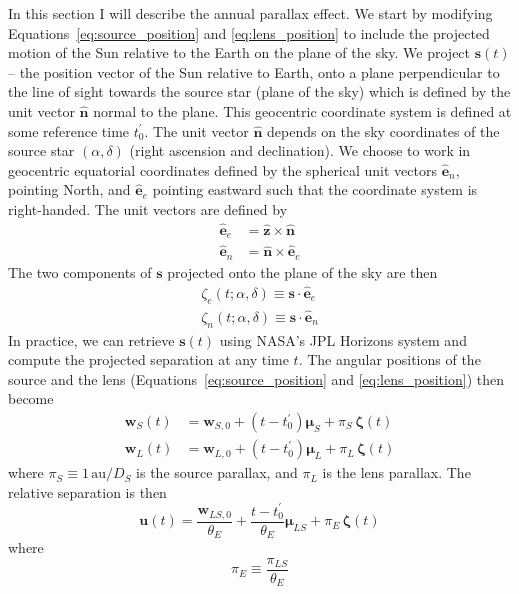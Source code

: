\documentclass[12pt,dvipsnames]{report}
\renewcommand{\vec}[1]{\boldsymbol{\mathbf{#1}}}
\begin{document}
In this section I will describe the annual parallax effect. We start by
modifying Equations~\ref{eq:source_position} and \ref{eq:lens_position} to
include the projected motion of the Sun relative to the Earth on the plane of
the sky. We project $\mathbf s(t)$ -- the position vector of the Sun relative to
Earth, onto a plane perpendicular to the line of sight towards the source star
(plane of the sky) which is defined by the unit vector $\boldsymbol{\hat n}$
normal to the plane. This geocentric coordinate system is defined at some reference time
$t_0^\prime$.  The unit vector $\boldsymbol{\hat n}$ depends on the sky
coordinates of the source star $(\alpha,\delta)$ (right ascension and
declination). We choose to work in geocentric equatorial coordinates defined by
the spherical unit vectors $\hat{\mathbf e}_n$, pointing North, and
$\hat{\mathbf e}_e$ pointing eastward such that the coordinate system is
right-handed. The unit vectors are defined by
\begin{align}
    \hat{\mathbf e}_e & = \hat{\mathbf z}\times \hat{\mathbf n}  \\
    \hat{\mathbf e}_n & = \hat{\mathbf n}\times\hat{\mathbf e}_e
\end{align}
The two components of $\mathbf s$ projected onto the plane of the sky are then
\begin{align}
    \zeta_e(t;\alpha,\delta)\equiv \mathbf s\cdot \hat{\mathbf e}_e 
    \label{eq:zeta_e_t}\\
    \zeta_n(t;\alpha,\delta)\equiv \mathbf s\cdot \hat{\mathbf e}_n
    \label{eq:zeta_n_t}
\end{align}
In practice, we can retrieve $\mathbf{s}(t)$ using NASA's JPL Horizons system and compute
the projected separation at any time $t$. 
The angular positions of the source and the lens
(Equations~\ref{eq:source_position} and \ref{eq:lens_position}) then become
\begin{align}
    \vec{w}_S(t) & = \vec{w}_{S,0}+(t-t_0^\prime)\boldsymbol{\mu}_S
    +\pi_S\,\boldsymbol{\zeta}(t)                            \\
    \vec{w}_L(t) & = \vec{w}_{L,0}+(t-t_0^\prime)\boldsymbol{\mu}_L
    +\pi_L\,\boldsymbol{\zeta}(t)
\end{align}
where  $\pi_S\equiv 1\,\mathrm{au}/D_S$ is the source parallax, and $\pi_L$ is the
lens parallax.
The relative separation is then
\begin{equation}
    \boldsymbol{u}(t)= \frac{\vec{w}_{LS, 0}}{\theta_E}
    +\frac{t-t_0^\prime}{\theta_E}\boldsymbol{\mu}_{LS}+\pi_{E}\,\boldsymbol{\zeta}(t)
    \label{eq:relative_separation_parallax}
\end{equation}
where
\begin{equation}
    \pi_E\equiv \frac{\pi_{LS}}{\theta_E}
    \label{eq:pi_E}
\end{equation}
\end{document}
